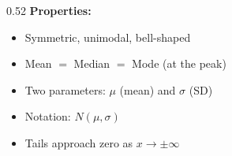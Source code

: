 \documentclass[aspectratio=169, 11pt]{beamer}
\begin{document}
{
\begin{frame}[t, plain]
  \vspace{0.45cm}\par
  \hspace{0.55cm}%
  \begin{minipage}{0.9\textwidth}


    \begin{columns}[T]
      \begin{column}{0.52\textwidth}
        \small
        \textbf{Properties:}
        \begin{itemize}
          \setlength{\itemsep}{0.35em}
          \item Symmetric, unimodal, bell-shaped
          \item Mean $=$ Median $=$ Mode (at the peak)
          \item Two parameters: $\mu$ (mean) and $\sigma$ (SD)
          \item Notation: $N(\mu, \sigma)$
          \item Tails approach zero as $x \to \pm\infty$
        \end{itemize}


\end{column}
\end{columns}
\end{minipage}
\end{frame}}
\end{document}
